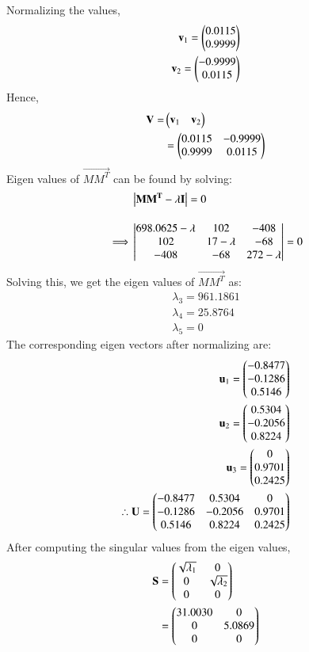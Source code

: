 \documentclass[journal,12pt,twocolumn]{IEEEtran}
\begin{document}
Normalizing the values,
\begin{align}
    \mathbf v_1 = \begin{pmatrix}0.0115\\0.9999\end{pmatrix}\\
    \mathbf v_2 = \begin{pmatrix}-0.9999\\0.0115\end{pmatrix}
\end{align}
Hence, 
\begin{align}
    \mathbf V=& \begin{pmatrix}\mathbf v_1 & \mathbf v_2\end{pmatrix}\\
    &=\begin{pmatrix}0.0115 & -0.9999\\0.9999 & 0.0115\end{pmatrix}
\end{align}
Eigen values of $\vec{MM^T}$ can be found by solving:
\begin{align}
     &\left\vert\mathbf{MM^T}-\lambda \mathbf {I}\right\vert = 0\\[1em]
	 \implies & \begin{vmatrix}698.0625- \lambda & 102 & -408\\ 102 & 17- \lambda & -68\\ -408 & -68 & 272-\lambda\end{vmatrix}=0
\end{align}
Solving this, we get the eigen values of $\vec{MM^T}$ as:
\begin{align}
    \lambda_3= 961.1861\\
    \lambda_4= 25.8764\\
    \lambda_5= 0
\end{align}
The corresponding eigen vectors after normalizing are:
\begin{align}
    \mathbf u_1 = \begin{pmatrix}-0.8477\\-0.1286\\0.5146\end{pmatrix}\\
    \mathbf u_2= \begin{pmatrix}0.5304\\-0.2056\\0.8224\end{pmatrix}\\
    \mathbf u_3= \begin{pmatrix}0 \\0.9701\\ 0.2425\end{pmatrix}\\
    \therefore \mathbf U= \begin{pmatrix}-0.8477& 0.5304 & 0\\
   -0.1286 & -0.2056 & 0.9701\\
    0.5146 & 0.8224 & 0.2425\end{pmatrix}
\end{align}
After computing the singular values from the eigen values, \begin{align}
    \mathbf S &= \begin{pmatrix}\sqrt{\lambda _1} & 0\\ 0 & \sqrt{\lambda_2}\\ 0 & 0\end{pmatrix}\\
    &= \begin{pmatrix}31.0030 & 0 \\ 0 & 5.0869 \\0 & 0\end{pmatrix}
\end{align}
\end{document}
